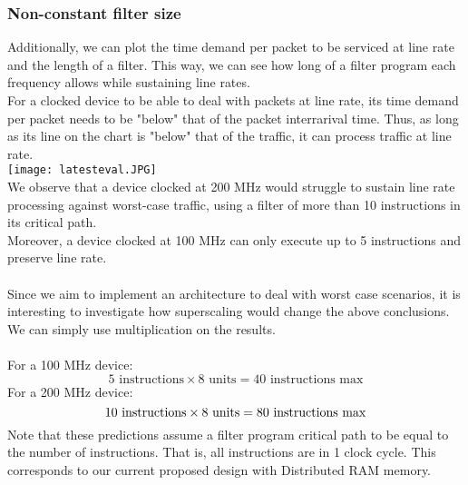\documentclass{l4proj}
\begin{document}
\subsubsection{Non-constant filter size}
Additionally, we can plot the time demand per packet to be serviced at line rate and the length of a filter. This way, we can see how long of a filter program each frequency allows while sustaining line rates.\\
For a clocked device to be able to deal with packets at line rate, its time demand per packet needs to be "below" that of the packet interrarival time. Thus, as long as its line on the chart is "below" that of the traffic, it can process traffic at line rate.\\
\texttt{[image: latesteval.JPG]}\\
We observe that a device clocked at 200 MHz would struggle to sustain line rate processing against worst-case traffic, using a filter of more than 10 instructions in its critical path.\\
Moreover, a device clocked at 100 MHz can only execute up to 5 instructions and preserve line rate.\\\\
Since we aim to implement an architecture to deal with worst case scenarios, it is interesting to investigate how superscaling would change the above conclusions. We can simply use multiplication on the results.\\\\
For a 100 MHz device:\\
\begin{equation}
 5 \text{ instructions} \times 8 \text{ units} = 40 \text{ instructions max}\nonumber
\end{equation}
For a 200 MHz device:\\
\begin{equation}
 10 \text{ instructions} \times 8 \text{ units} = 80 \text{ instructions max}\nonumber\\\\
\end{equation}
Note that these predictions assume a filter program critical path to be equal to the number of instructions. That is, all instructions are in 1 clock cycle. This corresponds to our current proposed design with Distributed RAM memory.
\end{document}

